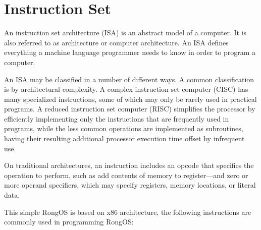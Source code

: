 \documentclass{swfcthesis}
\begin{document}
\section{Instruction Set}

An instruction set architecture (ISA) is an abstract model of a computer. It is also
referred to as architecture or computer architecture. An ISA defines everything a machine
language programmer needs to know in order to program a computer.

An ISA may be classified in a number of different ways. A common classification is by
architectural complexity. A complex instruction set computer (CISC) has many specialized
instructions, some of which may only be rarely used in practical programs. A reduced
instruction set computer (RISC) simplifies the processor by efficiently implementing only
the instructions that are frequently used in programs, while the less common operations
are implemented as subroutines, having their resulting additional processor execution time
offset by infrequent use.

On traditional architectures, an instruction includes an opcode that specifies the
operation to perform, such as add contents of memory to register—and zero or more operand
specifiers, which may specify registers, memory locations, or literal data\cite{wiki:isa}.

This simple RongOS is based on x86 architecture, the following instructions are commonly
used in programming RongOS:%
\end{document}
